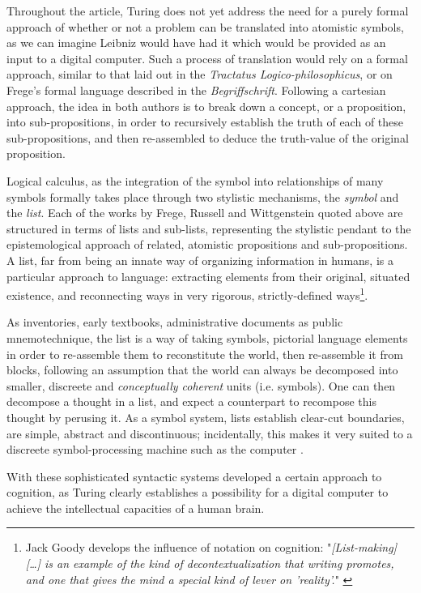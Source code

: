 Throughout the article, Turing does not yet address the need for a purely formal approach of whether or not a problem can be translated into atomistic symbols, as we can imagine Leibniz would have had it which would be provided as an input to a digital computer. Such a process of translation would rely on a formal approach, similar to that laid out in the \emph{Tractatus Logico-philosophicus}, or on Frege's formal language described in the \emph{Begriffschrift}. Following a cartesian approach, the idea in both authors is to break down a concept, or a proposition, into sub-propositions, in order to recursively establish the truth of each of these sub-propositions, and then re-assembled to deduce the truth-value of the original proposition.

Logical calculus, as the integration of the symbol into relationships of many symbols formally takes place through two stylistic mechanisms, the \emph{symbol} and the \emph{list}. Each of the works by Frege, Russell and Wittgenstein quoted above are structured in terms of lists and sub-lists, representing the stylistic pendant to the epistemological approach of related, atomistic propositions and sub-propositions. A list, far from being an innate way of organizing information in humans, is a particular approach to language: extracting elements from their original, situated existence, and reconnecting ways in very rigorous, strictly-defined ways\footnote{Jack Goody develops the influence of notation on cognition: "\emph{[List-making] [\dots] is an example of the kind of decontextualization that writing promotes, and one that gives the mind a special kind of lever on 'reality'.}" \citep{goody_domestication_1977}}.

As inventories, early textbooks, administrative documents as public mnemotechnique, the list is a way of taking symbols, pictorial language elements in order to re-assemble them to reconstitute the world, then re-assemble it from blocks, following an assumption that the world can always be decomposed into smaller, discreete and \emph{conceptually coherent} units (i.e. symbols). One can then decompose a thought in a list, and expect a counterpart to recompose this thought by perusing it. As a symbol system, lists establish clear-cut boundaries, are simple, abstract and discontinuous; incidentally, this makes it very suited to a discreete symbol-processing machine such as the computer \citep{depaz_stylistique_2023}.

With these sophisticated syntactic systems developed a certain approach to cognition, as Turing clearly establishes a possibility for a digital computer to achieve the intellectual capacities of a human brain.

